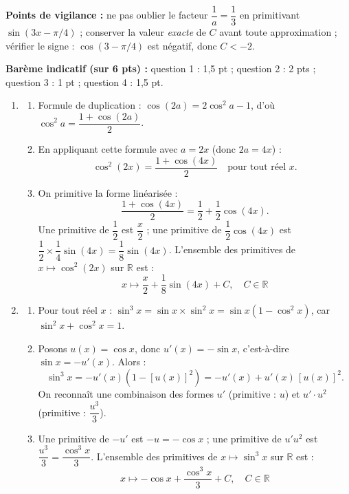 \documentclass[11pt]{article}
\begin{document}
\begin{corrige}
\begin{enumerate}
\textbf{Points de vigilance :} ne pas oublier le facteur $\dfrac{1}{a} = \dfrac{1}{3}$ en primitivant $\sin(3x - \pi/4)$ ; conserver la valeur \emph{exacte} de $C$ avant toute approximation ; vérifier le signe : $\cos(3 - \pi/4)$ est négatif, donc $C < -2$.
\end{enumerate}
\end{corrige}

\begin{corrige}
\textbf{Barème indicatif (sur 6 pts) :} question 1 : 1,5 pt ; question 2 : 2 pts ; question 3 : 1 pt ; question 4 : 1,5 pt.

\begin{enumerate}
\item \begin{enumerate}
\item Formule de duplication : $\cos(2a) = 2\cos^2 a - 1$, d'où $\cos^2 a = \dfrac{1 + \cos(2a)}{2}$.
\item En appliquant cette formule avec $a = 2x$ (donc $2a = 4x$) :
\[ \cos^2(2x) = \frac{1 + \cos(4x)}{2} \quad \text{pour tout réel } x. \]
\item On primitive la forme linéarisée :
\[ \frac{1 + \cos(4x)}{2} = \frac{1}{2} + \frac{1}{2}\cos(4x). \]
Une primitive de $\dfrac{1}{2}$ est $\dfrac{x}{2}$ ; une primitive de $\dfrac{1}{2}\cos(4x)$ est $\dfrac{1}{2} \times \dfrac{1}{4}\sin(4x) = \dfrac{1}{8}\sin(4x)$. L'ensemble des primitives de $x \mapsto \cos^2(2x)$ sur $\mathbb{R}$ est :
\[ \boxed{x \mapsto \frac{x}{2} + \frac{1}{8}\sin(4x) + C, \quad C \in \mathbb{R}} \]
\end{enumerate}
\item \begin{enumerate}
\item Pour tout réel $x$ : $\sin^3 x = \sin x \times \sin^2 x = \sin x \left(1 - \cos^2 x\right)$, car $\sin^2 x + \cos^2 x = 1$.
\item Posons $u(x) = \cos x$, donc $u'(x) = -\sin x$, c'est-à-dire $\sin x = -u'(x)$. Alors :
\[ \sin^3 x = -u'(x)\left(1 - [u(x)]^2\right) = -u'(x) + u'(x)\,[u(x)]^2. \]
On reconnaît une combinaison des formes $u'$ (primitive : $u$) et $u' \cdot u^2$ (primitive : $\dfrac{u^3}{3}$).
\item Une primitive de $-u'$ est $-u = -\cos x$ ; une primitive de $u'u^2$ est $\dfrac{u^3}{3} = \dfrac{\cos^3 x}{3}$. L'ensemble des primitives de $x \mapsto \sin^3 x$ sur $\mathbb{R}$ est :
\[ \boxed{x \mapsto -\cos x + \frac{\cos^3 x}{3} + C, \quad C \in \mathbb{R}} \]

\end{enumerate}
\end{enumerate}
\end{corrige}
\end{document}
